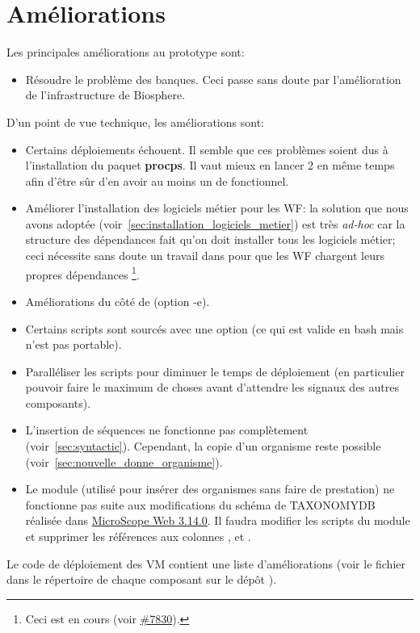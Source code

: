 \section{Améliorations}

Les principales améliorations au prototype sont:
\begin{itemize}
    \item Résoudre le problème des banques.
          Ceci passe sans doute par l'amélioration de l'infrastructure de Biosphere.
\end{itemize}


D'un point de vue technique, les améliorations sont:
\begin{itemize}
    \item Certains déploiements échouent.
          Il semble que ces problèmes soient dus à l'installation du paquet \textbf{procps}.
          Il vaut mieux en lancer 2 en même temps afin d'être sûr d'en avoir au moins un de fonctionnel.
    \item Améliorer l'installation des logiciels métier pour les WF:
          la solution que nous avons adoptée (voir~\autoref{sec:installation_logiciels_metier}) est très \textit{ad-hoc}
          car la structure des dépendances fait qu'on doit installer tous les logiciels métier;
          ceci nécessite sans doute un travail dans  pour que les WF chargent leurs propres dépendances
          \footnote{Ceci est en cours (voir \href{https://intranet.genoscope.cns.fr/agc/redmine/issues/7830}{\#7830}).}.
    \item Améliorations du côté de  (option -e).
    \item Certains scripts sont sourcés avec une option (ce qui est valide en bash mais n'est pas portable).
    \item Paralléliser les scripts pour diminuer le temps de déploiement (en particulier pouvoir faire le maximum de choses avant d'attendre les signaux des autres composants).
    \item L'insertion de séquences ne fonctionne pas complètement (voir~\autoref{sec:syntactic}).
          Cependant, la copie d'un organisme reste possible (voir~\autoref{sec:nouvelle_donne_organisme}).
    \item Le module  (utilisé pour insérer des organismes sans faire de prestation)
          ne fonctionne pas suite aux modifications du schéma de TAXONOMYDB réalisée dans \href{https://intranet.genoscope.cns.fr/agc/redmine/versions/142}{MicroScope Web 3.14.0}.
          Il faudra modifier les scripts du module et supprimer les références aux colonnes ,  et .
\end{itemize}

Le code de déploiement des VM contient une liste d'améliorations (voir le fichier  dans le répertoire de chaque composant sur le dépôt ).
